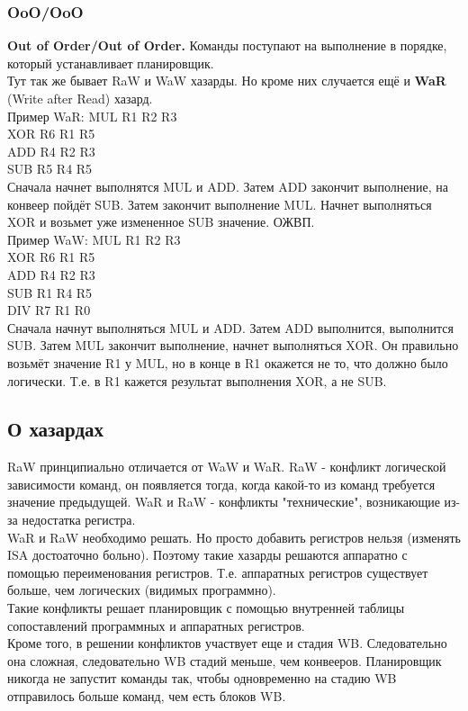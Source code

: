 \documentclass[12pt, a4paper]{article}
\begin{document}
\subsubsection{OoO/OoO}
\textbf{Out of Order/Out of Order.} Команды поступают на выполнение в порядке, который устанавливает планировщик.\\
Тут так же бывает RaW и WaW хазарды. Но кроме них случается ещё и \textbf{WaR} (Write after Read) хазард.\\
Пример WaR:
MUL R1 R2 R3\\
XOR R6 R1 R5\\
ADD R4 R2 R3\\
SUB R5 R4 R5\\
Сначала начнет выполнятся MUL и ADD. Затем ADD закончит выполнение, на конвеер пойдёт SUB. Затем закончит выполнение MUL. Начнет выполняться XOR и возьмет уже измененное SUB значение. ОЖВП.\\
Пример WaW:
MUL R1 R2 R3\\
XOR R6 R1 R5\\
ADD R4 R2 R3\\
SUB R1 R4 R5\\
DIV R7 R1 R0\\
Сначала начнут выполняться MUL и ADD. Затем ADD выполнится, выполнится SUB. Затем MUL закончит выполнение, начнет выполняться XOR. Он правильно возьмёт значение R1 у MUL, но в конце в R1 окажется не то, что должно было логически. Т.е. в R1 кажется результат выполнения XOR, а не SUB.
\subsection{О хазардах}
RaW принципиально отличается от WaW и WaR. RaW - конфликт логической зависимости команд, он появляется тогда, когда какой-то из команд требуется значение предыдущей. WaR и RaW - конфликты "технические", возникающие из-за недостатка регистра.\\
WaR и RaW необходимо решать. Но просто добавить регистров нельзя (изменять ISA достоаточно больно). Поэтому такие хазарды решаются аппаратно с помощью переименования регистров. Т.е. аппаратных регистров существует больше, чем логических (видимых программно).\\
Такие конфликты решает планировщик с помощью внутренней таблицы сопоставлений программных и аппаратных регистров.\\
Кроме того, в решении конфликтов участвует еще и стадия WB. Следовательно она сложная, следовательно WB стадий меньше, чем конвееров. Планировщик никогда не запустит команды так, чтобы одновременно на стадию WB отправилось больше команд, чем есть блоков WB.
\end{document}
